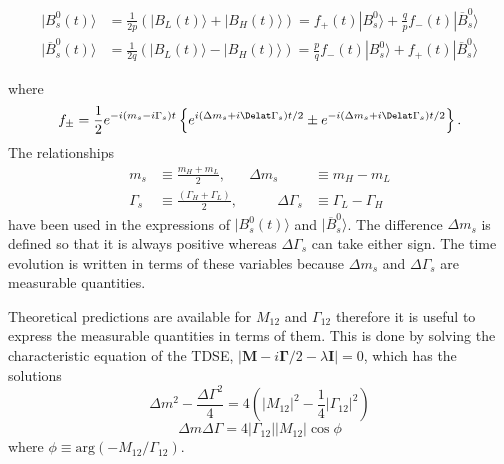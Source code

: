 {\begin{align}
| B^{0}_{s}(t) \rangle &= \frac{1}{2p}\left(|B_{L}(t)\rangle + |B_{H}(t) \rangle \right)  = f_{+}(t) |B^{0}_{s} \rangle + \frac{q}{p}f_{-}(t) |\overline{B}^{0}_{s}\rangle \\
| \overline{B}^{0}_{s}(t) \rangle &= \frac{1}{2q}\left(|B_{L}(t)\rangle - |B_{H}(t) \rangle \right)  = \frac{p}{q}f_{-}(t) |B^{0}_{s} \rangle+ f_{+}(t) |\overline{B}^{0}_{s}\rangle 
\end{align}

where 
\begin{equation}
f_{\pm} = \frac{1}{2} e^{-i(m_s - i\Gamma_s)t} \left \{ e^{i(\Delta m_s + i \Delat\Gamma_s)t/2} \pm e^{-i(\Delta m_s + i \Delat\Gamma_s)t/2} \right \}.
\end{equation}
The relationships
\begin{align}
m_s &\equiv \frac{m_H + m_L}{2}, &  \Delta m_s &\equiv m_H - m_L\\
\Gamma_s &\equiv \frac{(\Gamma_H + \Gamma_L)}{2}, & \qquad \Delta \Gamma_s &\equiv \Gamma_L - \Gamma_H
\label{eq:deltas}
\end{align}
have been used in the expressions of $|B^{0}_{s}(t)\rangle$ and $|\overline{B}^{0}_{s} \rangle$. The difference $\Delta m_s$ is defined so that it is always positive whereas $\Delta\Gamma_s$ can take either sign. The time evolution is written in terms of these variables because $\Delta m_s$ and $\Delta\Gamma_s$ are measurable quantities.

Theoretical predictions are available for $M_{12}$ and $\Gamma_{12}$ therefore it is useful to express the measurable quantities in terms of them. This is done by solving the characteristic equation of the TDSE, $|\mathbf{M} - i \mathbf{\Gamma}/2 - \lambda \mathbf{I}| = 0$, which has the solutions
\begin{equation}
\Delta m^2 - \frac{\Delta\Gamma^2}{4} = 4(|M_{12}|^2 - \frac{1}{4} |\Gamma_{12}|^2) 
\end{equation}
\begin{equation}
\Delta m \Delta \Gamma = 4 |\Gamma_{12}| |M_{12}| \cos \phi
\end{equation}
where $\phi \equiv \mathrm{arg}(-M_{12}/\Gamma_{12})$.

}

